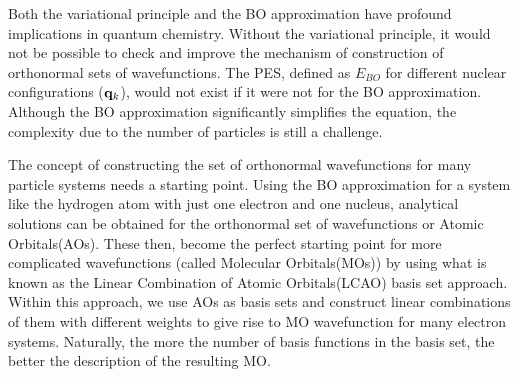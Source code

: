             Both the variational principle and the BO approximation have profound implications in quantum chemistry. Without the variational principle, it would not be possible to check and improve the mechanism of construction of orthonormal sets of wavefunctions. The PES, defined as $E_{BO}$ for different nuclear configurations (${\mathbf {q}}_k$), would not exist if it were not for the BO approximation. Although the BO approximation significantly simplifies the \Schrodinger{} equation, the complexity due to the number of particles is still a challenge.

            The concept of constructing the set of orthonormal wavefunctions for many particle systems needs a starting point. Using the BO approximation for a system like the hydrogen atom with just one electron and one nucleus, analytical solutions can be obtained for the orthonormal set of wavefunctions or Atomic Orbitals(AOs). These then, become the perfect starting point for more complicated wavefunctions (called Molecular Orbitals(MOs)) by using what is known as the Linear Combination of Atomic Orbitals(LCAO) basis set approach. Within this approach, we use AOs as basis sets and construct linear combinations of them with different weights to give rise to MO wavefunction for many electron systems. Naturally, the more the number of basis functions in the basis set, the better the description of the resulting MO.

